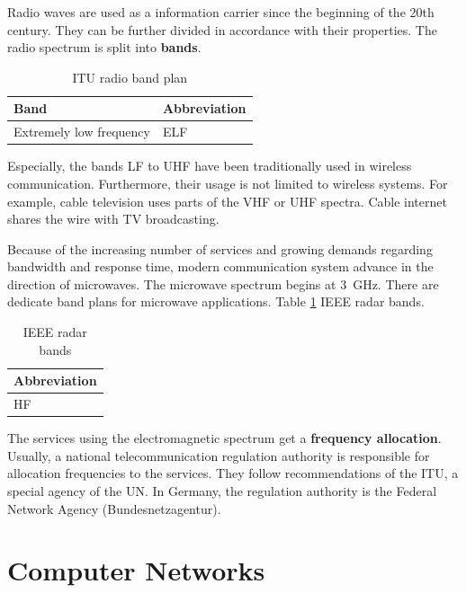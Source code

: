 \begin{refsection}
Radio waves are used as a information carrier since the beginning of the 20th century. They can be further divided in accordance with their properties. The radio spectrum is split into  \textbf{bands}.

\begin{table}[H]
	\centering
	\caption[ITU radio band plan]{\ac{ITU} radio band plan}
	\begin{tabular}{|l|l|}
		\hline
		Band & Abbreviation \\
		\hline
		\hline
		Extremely low frequency & ELF \\
		\hline
	\end{tabular}
\end{table}

Especially, the bands LF to UHF have been traditionally used in wireless communication. Furthermore, their usage is not limited to wireless systems. For example, cable television uses parts of the VHF or UHF spectra. Cable internet shares the wire with TV broadcasting.

Because of the increasing number of services and growing demands regarding bandwidth and response time, modern communication system advance in the direction of microwaves. The microwave spectrum begins at \SI{3}{GHz}. There are dedicate band plans for microwave applications. Table \ref{tab:ch01:IEEE_radar_bands} IEEE radar bands.

\begin{table}[H]
	\centering
	\caption{IEEE radar bands}
	\label{tab:ch01:IEEE_radar_bands}
	\begin{tabular}{|l|}
		\hline
		Abbreviation \\
		\hline
		\hline
		HF \\
		\hline
	\end{tabular}
\end{table}

The services using the electromagnetic spectrum get a  \textbf{frequency allocation}. Usually, a national telecommunication regulation authority is responsible for allocation frequencies to the services. They follow recommendations of the \ac{ITU}, a special agency of the \ac{UN}. In Germany, the regulation authority is the Federal Network Agency (Bundesnetzagentur).

\section{Computer Networks}



\end{refsection}
